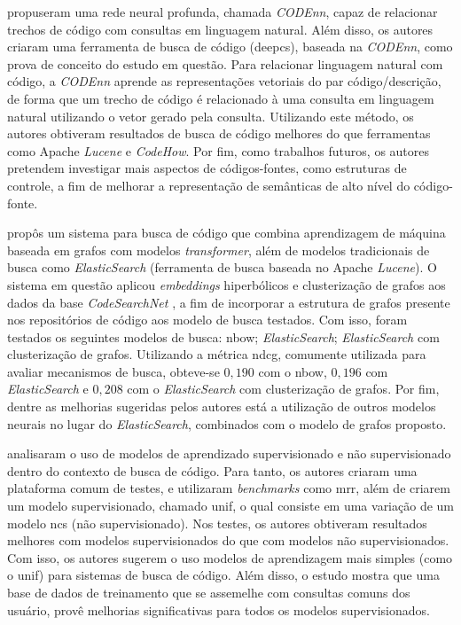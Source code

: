 \textcite{Gu2018DeepCS} propuseram uma rede neural profunda, chamada \textit{CODEnn}, capaz de relacionar trechos de código com consultas em linguagem natural. Além disso, os autores criaram uma ferramenta de busca de código (\gls{deepcs}), baseada na \textit{CODEnn}, como prova de conceito do estudo em questão. Para relacionar linguagem natural com código, a \textit{CODEnn} aprende as representações vetoriais do par código/descrição, de forma que um trecho de código é relacionado à uma consulta em linguagem natural utilizando o vetor gerado pela consulta. Utilizando este método, os autores obtiveram resultados de busca de código melhores do que ferramentas como Apache \textit{Lucene} e \textit{CodeHow}. Por fim, como trabalhos futuros, os autores pretendem investigar mais aspectos de códigos-fontes, como estruturas de controle, a fim de melhorar a representação de semânticas de alto nível do código-fonte.

\textcite{Chu2019AGA} propôs um sistema para busca de código que combina aprendizagem de máquina baseada em grafos com modelos \emph{transformer}, além de modelos tradicionais de busca como \textit{ElasticSearch} (ferramenta de busca baseada no Apache \textit{Lucene}). O sistema em questão aplicou \emph{embeddings} hiperbólicos e clusterização de grafos aos dados da base \emph{CodeSearchNet} \cite{Husain2019CodeSearchNetCE}, a fim de incorporar a estrutura de grafos presente nos repositórios de código aos modelo de busca testados. Com isso, foram testados os seguintes modelos de busca: \gls{nbow}; \textit{ElasticSearch}; \textit{ElasticSearch} com clusterização de grafos. Utilizando a métrica \gls{ndcg}, comumente utilizada para avaliar mecanismos de busca, obteve-se $0,190$ com o \gls{nbow}, $0,196$ com \textit{ElasticSearch} e $0,208$ com o \textit{ElasticSearch} com clusterização de grafos. Por fim, dentre as melhorias sugeridas pelos autores está a utilização de outros modelos neurais no lugar do \textit{ElasticSearch}, combinados com o modelo de grafos proposto.

\textcite{Cambronero2019WhenDL} analisaram o uso de modelos de aprendizado supervisionado e não supervisionado dentro do contexto de busca de código. Para tanto, os autores criaram uma plataforma comum de testes, e utilizaram \textit{benchmarks} como \gls{mrr}, além de criarem um modelo supervisionado, chamado \gls{unif}, o qual consiste em uma variação de um modelo \gls{ncs} (não supervisionado). Nos testes, os autores obtiveram resultados melhores com modelos supervisionados do que com modelos não supervisionados. Com isso, os autores sugerem o uso modelos de aprendizagem mais simples (como o \gls{unif}) para sistemas de busca de código. Além disso, o estudo mostra que uma base de dados de treinamento que se assemelhe com consultas comuns dos usuário, provê melhorias significativas para todos os modelos supervisionados.

